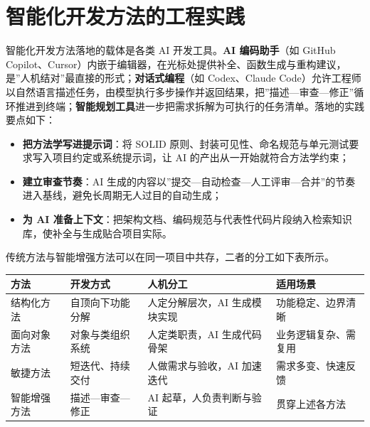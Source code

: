 \documentclass[12pt,a4paper,twoside,openany]{ctexbook}
\numberwithin{figure}{chapter}
\numberwithin{table}{chapter}
\providecommand{\tightlist}{\setlength{\itemsep}{0pt}\setlength{\parskip}{0pt}}
\newcounter{none}
\begin{document}
\section{智能化开发方法的工程实践}\label{ux667aux80fdux5316ux5f00ux53d1ux65b9ux6cd5ux7684ux5de5ux7a0bux5b9eux8df5}

智能化开发方法落地的载体是各类 AI 开发工具。\textbf{AI 编码助手}（如
GitHub
Copilot、Cursor）内嵌于编辑器，在光标处提供补全、函数生成与重构建议，是''人机结对''最直接的形式；\textbf{对话式编程}（如
Codex、Claude
Code）允许工程师以自然语言描述任务，由模型执行多步操作并返回结果，把''描述---审查---修正''循环推进到终端；\textbf{智能规划工具}进一步把需求拆解为可执行的任务清单。落地的实践要点如下：

\begin{itemize}
\tightlist
\item
  \textbf{把方法学写进提示词}：将 SOLID
  原则、封装可见性、命名规范与单元测试要求写入项目约定或系统提示词，让
  AI 的产出从一开始就符合方法学约束；
\item
  \textbf{建立审查节奏}：AI
  生成的内容以''提交---自动检查---人工评审---合并''的节奏进入基线，避免长周期无人过目的自动生成；
\item
  \textbf{为 AI
  准备上下文}：把架构文档、编码规范与代表性代码片段纳入检索知识库，使补全与生成贴合项目实际。
\end{itemize}

传统方法与智能增强方法可以在同一项目中共存，二者的分工如下表所示。

{\def\LTcaptype{none} %
\begin{longtable}[]{@{}
  >{\raggedright\arraybackslash}p{}
  >{\raggedright\arraybackslash}p{}
  >{\raggedright\arraybackslash}p{}
  >{\raggedright\arraybackslash}p{}@{}}
\toprule\noalign{}
\begin{minipage}[b]{\linewidth}\raggedright
方法
\end{minipage} & \begin{minipage}[b]{\linewidth}\raggedright
开发方式
\end{minipage} & \begin{minipage}[b]{\linewidth}\raggedright
人机分工
\end{minipage} & \begin{minipage}[b]{\linewidth}\raggedright
适用场景
\end{minipage} \\
\midrule\noalign{}
\endhead
\bottomrule\noalign{}
\endlastfoot
结构化方法 & 自顶向下功能分解 & 人定分解层次，AI 生成模块实现 &
功能稳定、边界清晰 \\
面向对象方法 & 对象与类组织系统 & 人定类职责，AI 生成代码骨架 &
业务逻辑复杂、需复用 \\
敏捷方法 & 短迭代、持续交付 & 人做需求与验收，AI 加速迭代 &
需求多变、快速反馈 \\
智能增强方法 & 描述---审查---修正 & AI 起草，人负责判断与验证 &
贯穿上述各方法 \\
\end{longtable}
}
\end{document}
